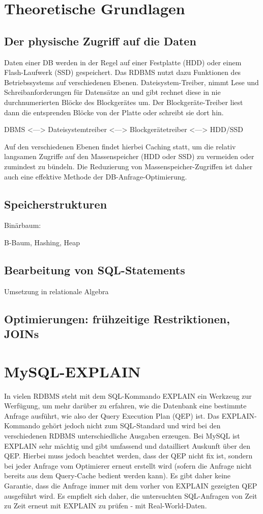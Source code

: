\section{Theoretische Grundlagen}
\subsection{Der physische Zugriff auf die Daten}
Daten einer DB werden in der Regel auf einer Festplatte (HDD) oder einem Flash-Laufwerk (SSD) gespeichert.
Das RDBMS nutzt dazu Funktionen des Betriebssystems auf verschiedenen Ebenen.
Dateisystem-Treiber, nimmt Lese und Schreibanforderungen für Datensätze an und gibt rechnet diese in nie durchnumerierten Blöcke des Blockgerätes um. Der Blockgeräte-Treiber liest dann die entsprenden Blöcke von der Platte oder schreibt sie dort hin.

DBMS <---> Dateisystemtreiber <---> Blockgerätetreiber <---> HDD/SSD 

Auf den verschiedenen Ebenen findet hierbei Caching statt, um die relativ langsamen Zugriffe auf den Massenspeicher (HDD oder SSD) zu vermeiden oder zumindest zu bündeln. Die Reduzierung von Massenspeicher-Zugriffen ist  daher auch eine effektive Methode der DB-Anfrage-Optimierung.

\subsection{Speicherstrukturen}

 Binärbaum:

 B-Baum, Hashing, Heap

\subsection{Bearbeitung von SQL-Statements}
 Umsetzung in relationale Algebra

\subsection{Optimierungen: frühzeitige Restriktionen, JOINs}


\section{MySQL-EXPLAIN}
In vielen RDBMS steht mit dem SQL-Kommando EXPLAIN ein Werkzeug zur Werfügung, um mehr darüber zu erfahren, wie die Datenbank eine bestimmte Anfrage ausführt, wie also der Query Execution Plan (QEP) ist. Das EXPLAIN-Kommando gehört jedoch nicht zum SQL-Standard und wird bei den verschiedenen RDBMS unterschiedliche Ausgaben erzeugen. Bei MySQL ist EXPLAIN sehr mächtig und gibt umfassend und datailliert Auskunft über den QEP. Hierbei muss jedoch beachtet werden, dass der QEP nicht fix ist, sondern bei jeder Anfrage vom Optimierer erneut erstellt wird (sofern die Anfrage nicht bereits aus dem Query-Cache bedient werden kann). Es gibt daher keine Garantie, dass die Anfrage immer mit dem vorher von EXPLAIN gezeigten QEP ausgeführt wird. Es empfielt sich daher, die untersuchten SQL-Anfragen von Zeit zu Zeit erneut mit EXPLAIN zu prüfen - mit Real-World-Daten.

